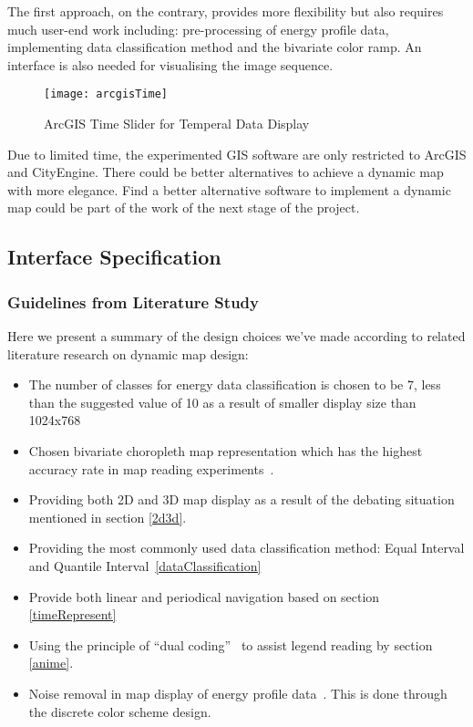 \documentclass[hidelinks,12pt]{article}
\begin{document}
The first approach, on the contrary, provides more flexibility but
also requires much user-end work including: pre-processing of energy
profile data, implementing data classification method and the
bivariate color ramp. An interface is also needed for visualising the
image sequence.

\begin{figure}[h!]
  \centering
  \texttt{[image: arcgisTime]}
  \caption{ArcGIS Time Slider for Temperal Data Display}
  \label{fig:arcgisTime}
\end{figure}

Due to limited time, the experimented GIS software are only restricted
to ArcGIS and CityEngine. There could be better alternatives to
achieve a dynamic map with more elegance. Find a better alternative
software to implement a dynamic map could be part of the work of the
next stage of the project.

\newpage
\subsection{Interface Specification}\label{interfaceSpec}
\subsubsection{Guidelines from Literature Study}
Here we present a summary of the design choices we've made according
to related literature research on dynamic map design:
\begin{itemize}
\item The number of classes for energy data classification is chosen
  to be 7, less than the suggested value of 10 as a result of smaller
  display size than 1024x768~\cite{doi:10.1559/1523040639298}
\item Chosen bivariate choropleth map representation which has the
  highest accuracy rate in map reading experiments~\cite{Elmer2012}.
\item Providing both 2D and 3D map display as a result of the debating
  situation mentioned in section \ref{2d3d}.
\item Providing the most commonly used data classification method:
  Equal Interval and Quantile Interval~\ref{dataClassification}
\item Provide both linear and periodical navigation based on section
  \ref{timeRepresent}
\item Using the principle of ``dual coding''~\cite{Resch2014} to
  assist legend reading by section \ref{anime}.
\item Noise removal in map display of energy profile
  data~\cite{Dorling1992}. This is done through the discrete color
  scheme design.
\end{itemize}
\end{document}

